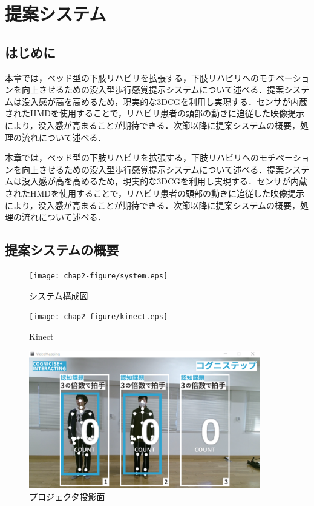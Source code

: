 \chapter{提案システム}

\thispagestyle{myheadings}

\section{はじめに}
本章では，ベッド型の下肢リハビリを拡張する，下肢リハビリへのモチベーションを向上させるための没入型歩行感覚提示システムについて述べる．提案システムは没入感が高を高めるため，現実的な3DCGを利用し実現する．センサが内蔵されたHMDを使用することで，リハビリ患者の頭部の動きに追従した映像提示により，没入感が高まることが期待できる．次節以降に提案システムの概要，処理の流れについて述べる．

本章では，ベッド型の下肢リハビリを拡張する，下肢リハビリへのモチベーションを向上させるための没入型歩行感覚提示システムについて述べる．提案システムは没入感が高を高めるため，現実的な3DCGを利用し実現する．センサが内蔵されたHMDを使用することで，リハビリ患者の頭部の動きに追従した映像提示により，没入感が高まることが期待できる．次節以降に提案システムの概要，処理の流れについて述べる．
\fi

\section{提案システムの概要}

\begin{figure}[tbp]
	\centering
			\texttt{[image: chap2-figure/system.eps]}
	\caption{システム構成図}
	\label{fig:system}
\end{figure}

\begin{figure}[tbp]
	\centering
			\texttt{[image: chap2-figure/kinect.eps]}
	\caption{Kinect}
	\label{fig:kinect}
\end{figure}

\begin{figure}[tbp]
	\centering
			\includegraphics[width=0.9\textwidth]{chap2-figure/vm_init.eps}
	\caption{プロジェクタ投影面}
	\label{fig:system}
\end{figure}

